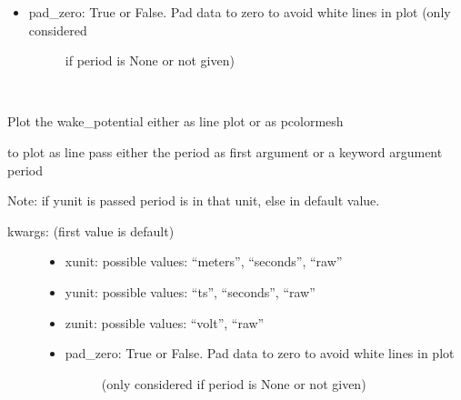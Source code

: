 \documentclass[letterpaper,10pt,openany,oneside,english]{sphinxmanual}
\begin{document}
\begin{fulllineitems}
\begin{fulllineitems}
\begin{description}
\begin{itemize}
\item {} \begin{description}
\item[{pad\_zero: True or False. Pad data to zero to avoid white lines in plot (only considered  }] \leavevmode
if period is None or not given)

\end{description}

\end{itemize}

\end{description}

\end{fulllineitems}


\begin{fulllineitems}
\label{\detokenize{plots:plots.SimplePlotter.wake_potential}}~
\begin{DUlineblock}{0em}
\item[] Plot the wake\_potential either as line plot or as pcolormesh  
\item[] to plot as line pass either the period as first argument or a keyword argument period  
\item[] Note: if yunit is passed period is in that unit, else in default value.  
\end{DUlineblock}
\begin{description}
\item[{kwargs: (first value is default)  }] \leavevmode\begin{itemize}
\item {} 
xunit: possible values: “meters”, “seconds”, “raw”

\item {} 
yunit: possible values: “ts”, “seconds”, “raw”

\item {} 
zunit: possible values: “volt”, “raw”

\item {} \begin{description}
\item[{pad\_zero: True or False. Pad data to zero to avoid white lines in plot  }] \leavevmode
(only considered if period is None or not given)

\end{description}


\end{itemize}
\end{description}
\end{fulllineitems}
\end{fulllineitems}
\end{document}
